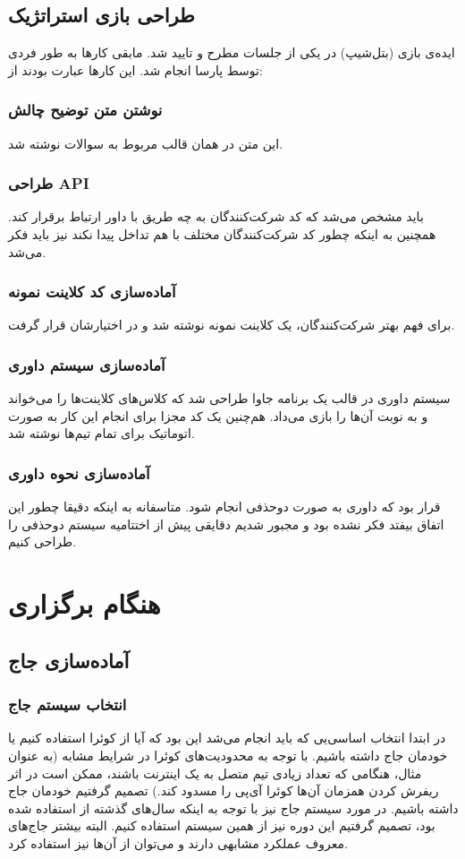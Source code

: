\documentclass{report}
\begin{document}
\section{طراحی بازی استراتژیک}
ایده‌ی بازی (بتل‌شیپ) در یکی از جلسات مطرح و تایید شد. مابقی کارها به طور فردی توسط پارسا انجام شد. این کارها عبارت بودند از:
\subsection{نوشتن متن توضیح چالش}
این متن در همان قالب مربوط به سوالات نوشته شد.
\subsection{طراحی API}
باید مشخص می‌شد که کد شرکت‌کنندگان به چه طریق با داور ارتباط برقرار کند. همچنین به اینکه چطور کد شرکت‌کنندگان مختلف با هم تداخل پیدا نکند نیز باید فکر می‌شد.
\subsection{آماده‌سازی کد کلاینت نمونه}
برای فهم بهتر شرکت‌کنندگان، یک کلاینت نمونه نوشته شد و در اختیارشان قرار گرفت.
\subsection{آماده‌سازی سیستم داوری}
سیستم داوری در قالب یک برنامه جاوا طراحی شد که کلاس‌های کلاینت‌ها را می‌خواند و به نوبت آن‌ها را بازی می‌داد. هم‌چنین یک کد مجزا برای انجام این کار به صورت اتوماتیک برای تمام تیم‌ها نوشته شد.
\subsection{آماده‌سازی نحوه داوری}
قرار بود که داوری به صورت دوحذفی انجام شود. متاسفانه به اینکه دقیقا چطور این اتفاق بیفتد فکر نشده بود و مجبور شدیم دقایقی پیش از اختتامیه سیستم دوحذفی را طراحی کنیم.

\chapter{هنگام برگزاری}
\localtableofcontents
\pagebreak

\section{آماده‌سازی جاج}
\subsection{انتخاب سیستم جاج}
در ابتدا انتخاب اساسی‌یی که باید انجام می‌شد این بود که آیا از کوئرا استفاده کنیم یا خودمان جاج داشته باشیم. با توجه به محدودیت‌های کوئرا در شرایط مشابه (به عنوان مثال، هنگامی که تعداد زیادی تیم متصل به یک اینترنت باشند، ممکن است در اثر ریفرش کردن همزمان آن‌ها کوئرا آی‌پی را مسدود کند.) تصمیم گرفتیم خودمان جاج داشته باشیم. در مورد سیستم جاج نیز با توجه به اینکه سال‌های گذشته از  استفاده شده بود، تصمیم گرفتیم این دوره نیز از همین سیستم استفاده کنیم. البته بیشتر جاج‌های معروف عملکرد مشابهی دارند و می‌توان از آن‌ها نیز استفاده کرد.
\end{document}
